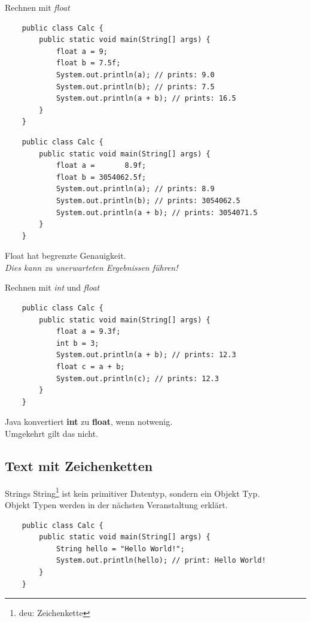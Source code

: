 \begin{frame}{Rechnen mit \emph{float}}
	\begin{lstlisting}
	public class Calc {
	    public static void main(String[] args) {
	        float a = 9;
	        float b = 7.5f;
	        System.out.println(a); // prints: 9.0
	        System.out.println(b); // prints: 7.5
	        System.out.println(a + b); // prints: 16.5
	    }
	}
	\end{lstlisting}
\framebreak
	\begin{lstlisting}
	public class Calc {
	    public static void main(String[] args) {
	        float a =       8.9f;
	        float b = 3054062.5f;
	        System.out.println(a); // prints: 8.9
	        System.out.println(b); // prints: 3054062.5
	        System.out.println(a + b); // prints: 3054071.5
	    }
	}
	\end{lstlisting}
	Float hat begrenzte Genauigkeit. \\
	\emph{Dies kann zu unerwarteten Ergebnissen führen!}
\end{frame}

\begin{frame}[fragile]{Rechnen mit \emph{int} und \emph{float}}
	\begin{lstlisting}
	public class Calc {
	    public static void main(String[] args) {
	        float a = 9.3f;
	        int b = 3;
	        System.out.println(a + b); // prints: 12.3
	        float c = a + b;
	        System.out.println(c); // prints: 12.3
	    }
	}
	\end{lstlisting}
	Java konvertiert \textbf{int} zu \textbf{float}, wenn notwenig. \\
	Umgekehrt gilt das nicht.
\end{frame}

\subsection{Text mit Zeichenketten}

\begin{frame}[fragile]{Strings}
	String\footnote{deu: Zeichenkette} ist kein primitiver Datentyp, sondern ein Objekt Typ. \\
	Objekt Typen werden in der nächsten Veranstaltung erklärt.
	\begin{lstlisting}
	public class Calc {
	    public static void main(String[] args) {
	        String hello = "Hello World!";
	        System.out.println(hello); // print: Hello World!
	    }
	}
	\end{lstlisting}
\end{frame}

